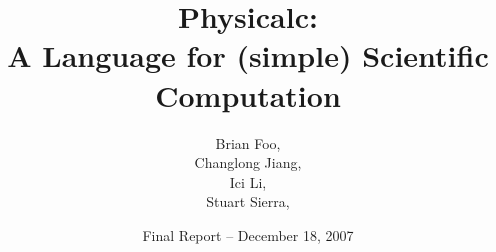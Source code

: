 \documentclass{report}
\begin{document}
\title{Physicalc:\\
A Language for (simple) Scientific Computation}

\date{Final Report -- December 18, 2007}

\author{Brian Foo, \\
Changlong Jiang, \\
Ici Li, \\
Stuart Sierra, }

\maketitle

\tableofcontents
















\end{document}
